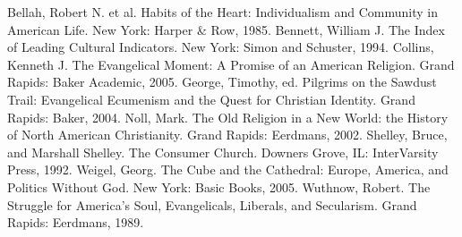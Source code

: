 \begin{readinglist}
\entry Bellah, Robert N. et al. Habits of the Heart: Individualism and Community in American Life.
  New York: Harper \& Row, 1985.
\entry Bennett, William J. The Index of Leading Cultural Indicators. New York: Simon and Schuster,
  1994.
\entry Collins, Kenneth J. The Evangelical Moment: A Promise of an American Religion. Grand Rapids:
  Baker Academic, 2005.
\entry George, Timothy, ed. Pilgrims on the Sawdust Trail: Evangelical Ecumenism and the Quest for
  Christian Identity. Grand Rapids: Baker, 2004.
\entry *Noll, Mark. The Old Religion in a New World: the History of North American Christianity.
  Grand Rapids: Eerdmans, 2002.
\entry Shelley, Bruce, and Marshall Shelley. The Consumer Church. Downers Grove, IL: InterVarsity
  Press, 1992.
\entry *Weigel, Georg. The Cube and the Cathedral: Europe, America, and Politics Without God. New
  York: Basic Books, 2005.
\entry Wuthnow, Robert. The Struggle for America’s Soul, Evangelicals, Liberals, and Secularism.
  Grand Rapids: Eerdmans, 1989.
\end{readinglist}
